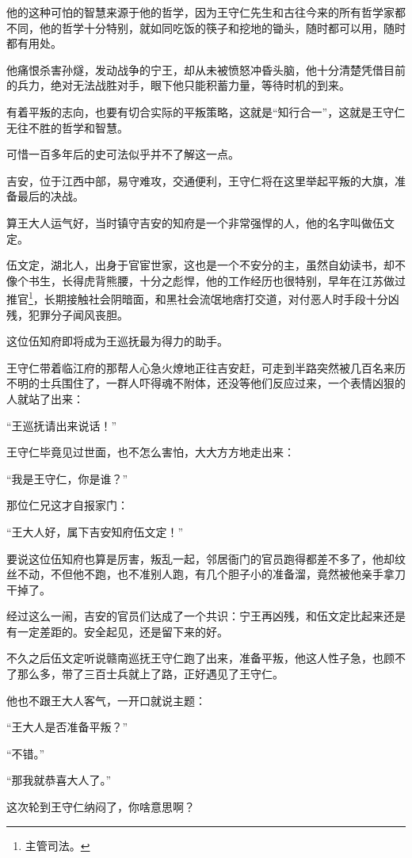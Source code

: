 \begin{multicols}{\theparacolNo}
		他的这种可怕的智慧来源于他的哲学，因为王守仁先生和古往今来的所有哲学家都不同，他的哲学十分特别，就如同吃饭的筷子和挖地的锄头，随时都可以用，随时都有用处。

		他痛恨杀害孙燧，发动战争的宁王，却从未被愤怒冲昏头脑，他十分清楚凭借目前的兵力，绝对无法战胜对手，眼下他只能积蓄力量，等待时机的到来。

		有着平叛的志向，也要有切合实际的平叛策略，这就是“知行合一”，这就是王守仁无往不胜的哲学和智慧。

		可惜一百多年后的史可法似乎并不了解这一点。

		吉安，位于江西中部，易守难攻，交通便利，王守仁将在这里举起平叛的大旗，准备最后的决战。

		算王大人运气好，当时镇守吉安的知府是一个非常强悍的人，他的名字叫做伍文定。

		伍文定，湖北人，出身于官宦世家，这也是一个不安分的主，虽然自幼读书，却不像个书生，长得虎背熊腰，十分之彪悍，他的工作经历也很特别，早年在江苏做过推官\footnote{主管司法。}，长期接触社会阴暗面，和黑社会流氓地痞打交道，对付恶人时手段十分凶残，犯罪分子闻风丧胆。

		这位伍知府即将成为王巡抚最为得力的助手。

		王守仁带着临江府的那帮人心急火燎地正往吉安赶，可走到半路突然被几百名来历不明的士兵围住了，一群人吓得魂不附体，还没等他们反应过来，一个表情凶狠的人就站了出来：

		“王巡抚请出来说话！”

		王守仁毕竟见过世面，也不怎么害怕，大大方方地走出来：

		“我是王守仁，你是谁？”

		那位仁兄这才自报家门：

		“王大人好，属下吉安知府伍文定！”

		要说这位伍知府也算是厉害，叛乱一起，邻居衙门的官员跑得都差不多了，他却纹丝不动，不但他不跑，也不准别人跑，有几个胆子小的准备溜，竟然被他亲手拿刀干掉了。

		经过这么一闹，吉安的官员们达成了一个共识：宁王再凶残，和伍文定比起来还是有一定差距的。安全起见，还是留下来的好。

		不久之后伍文定听说赣南巡抚王守仁跑了出来，准备平叛，他这人性子急，也顾不了那么多，带了三百士兵就上了路，正好遇见了王守仁。

		他也不跟王大人客气，一开口就说主题：

		“王大人是否准备平叛？”

		“不错。”

		“那我就恭喜大人了。”

		这次轮到王守仁纳闷了，你啥意思啊？


\end{multicols}
